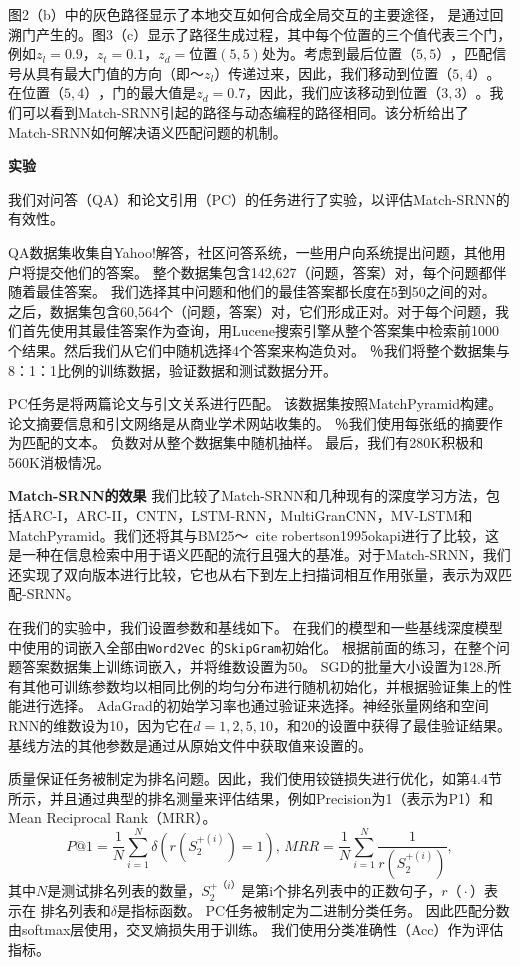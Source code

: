 图2（b）中的灰色路径显示了本地交互如何合成全局交互的主要途径，
是通过回溯门产生的。图3（c）显示了路径生成过程，其中每个位置的三个值代表三个门，例如$ z_l {=} 0.9，z_t {=} 0.1，z_d {=}$位置$(5,5)$处为$ $。考虑到最后位置$（5,5）$，匹配信号从具有最大门值的方向（即〜$ z_l $）传递过来，因此，我们移动到位置$（5,4）$。在位置$（5,4）$，门的最大值是$ z_d {=} 0.7 $，因此，我们应该移动到位置$（3,3）$。我们可以看到Match-SRNN引起的路径与动态编程的路径相同。该分析给出了Match-SRNN如何解决语义匹配问题的机制。


\textbf{实验}

我们对问答（QA）和论文引用（PC）的任务进行了实验，以评估Match-SRNN的有效性。

QA数据集收集自Yahoo!解答，社区问答系统，一些用户向系统提出问题，其他用户将提交他们的答案。
整个数据集包含142,627（问题，答案）对，每个问题都伴随着最佳答案。
我们选择其中问题和他们的最佳答案都长度在5到50之间的对。
之后，数据集包含60,564个（问题，答案）对，它们形成正对。对于每个问题，我们首先使用其最佳答案作为查询，用Lucene搜索引擎从整个答案集中检索前1000个结果。然后我们从它们中随机选择4个答案来构造负对。 ％我们将整个数据集与8：1：1比例的训练数据，验证数据和测试数据分开。

PC任务是将两篇论文与引文关系进行匹配。
该数据集按照MatchPyramid构建。
论文摘要信息和引文网络是从商业学术网站​​收集的。
％我们使用每张纸的摘要作为匹配的文本。
负数对从整个数据集中随机抽样。
最后，我们有280K积极和560K消极情况。

\textbf{Match-SRNN的效果}
我们比较了Match-SRNN和几种现有的深度学习方法，包括ARC-I，ARC-II，CNTN，LSTM-RNN，MultiGranCNN，MV-LSTM和MatchPyramid。我们还将其与BM25〜\ cite {robertson1995okapi}进行了比较，这是一种在信息检索中用于语义匹配的流行且强大的基准。对于Match-SRNN，我们还实现了双向版本进行比较，它也从右下到左上扫描词相互作用张量，表示为双匹配-SRNN。

在我们的实验中，我们设置参数和基线如下。
在我们的模型和一些基线深度模型中使用的词嵌入全部由\texttt {Word2Vec} 的\texttt {SkipGram}初始化。
根据前面的练习，在整个问题答案数据集上训练词嵌入，并将维数设置为50。
SGD的批量大小设置为128.所有其他可训练参数均以相同比例的均匀分布进行随机初始化，并根据验证集上的性能进行选择。 AdaGrad的初始学习率也通过验证来选择。神经张量网络和空间RNN的维数设为10，因为它在$ d = 1,2,5,10，$和$ 20 $的设置中获得了最佳验证结果。基线方法的其他参数是通过从原始文件中获取值来设置的。

质量保证任务被制定为排名问题。因此，我们使用铰链损失进行优化，如第4.4节所示，并且通过典型的排名测量来评估结果，例如Precision为1（表示为P1）和Mean Reciprocal Rank（MRR）。
\begin{equation*}
P@1=\frac{1}{N}\sum_{i=1}^{N}\delta(r(S_2^{+(i)})= 1),\,
MRR=\frac{1}{N}\sum_{i=1}^{N}\frac{1}{r({S_{2}^{+(i)}})},
\end{equation*}
其中$ N $是测试排名列表的数量，$ S_2 ^ {+（i）} $是第i个排名列表中的正数句子，$ r（\cdot）$表示在 排名列表和$ \delta $是指标函数。
PC任务被制定为二进制分类任务。 因此匹配分数由softmax层使用，交叉熵损失用于训练。
我们使用分类准确性（Acc）作为评估指标。

